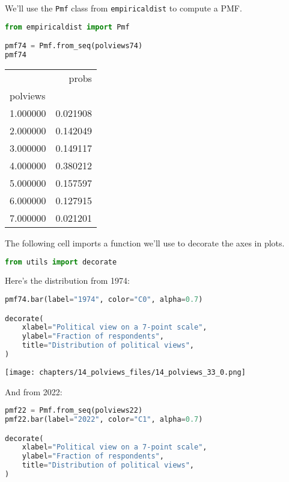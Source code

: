 We'll use the \passthrough{\lstinline!Pmf!} class from
\passthrough{\lstinline!empiricaldist!} to compute a PMF.

\begin{lstlisting}[language=Python,style=source]
from empiricaldist import Pmf

pmf74 = Pmf.from_seq(polviews74)
pmf74
\end{lstlisting}

\begin{tabular}{lr}
\midrule
 & probs \\
polviews &  \\
\midrule
1.000000 & 0.021908 \\
2.000000 & 0.142049 \\
3.000000 & 0.149117 \\
4.000000 & 0.380212 \\
5.000000 & 0.157597 \\
6.000000 & 0.127915 \\
7.000000 & 0.021201 \\
\midrule
\end{tabular}

The following cell imports a function we'll use to decorate the axes in
plots.

\begin{lstlisting}[language=Python,style=source]
from utils import decorate
\end{lstlisting}

Here's the distribution from 1974:

\begin{lstlisting}[language=Python,style=source]
pmf74.bar(label="1974", color="C0", alpha=0.7)

decorate(
    xlabel="Political view on a 7-point scale",
    ylabel="Fraction of respondents",
    title="Distribution of political views",
)
\end{lstlisting}

\begin{center}
\texttt{[image: chapters/14\_polviews\_files/14\_polviews\_33\_0.png]}
\end{center}

And from 2022:

\begin{lstlisting}[language=Python,style=source]
pmf22 = Pmf.from_seq(polviews22)
pmf22.bar(label="2022", color="C1", alpha=0.7)

decorate(
    xlabel="Political view on a 7-point scale",
    ylabel="Fraction of respondents",
    title="Distribution of political views",
)
\end{lstlisting}

